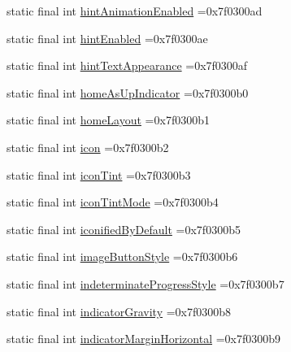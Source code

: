 \begin{DoxyCompactItemize}
\item 
static final int \mbox{\hyperlink{classcom_1_1example_1_1trainawearapplication_1_1_r_1_1attr_af8b7406b963a895c7f507e1d3a7715b4}{hint\+Animation\+Enabled}} =0x7f0300ad
\item 
static final int \mbox{\hyperlink{classcom_1_1example_1_1trainawearapplication_1_1_r_1_1attr_a52a1e53e1d4b6479a603c077cb747b50}{hint\+Enabled}} =0x7f0300ae
\item 
static final int \mbox{\hyperlink{classcom_1_1example_1_1trainawearapplication_1_1_r_1_1attr_adbb97bf82712b07fcc18eb977d167e37}{hint\+Text\+Appearance}} =0x7f0300af
\item 
static final int \mbox{\hyperlink{classcom_1_1example_1_1trainawearapplication_1_1_r_1_1attr_a07191ab6b641a690afd11e982de52fd8}{home\+As\+Up\+Indicator}} =0x7f0300b0
\item 
static final int \mbox{\hyperlink{classcom_1_1example_1_1trainawearapplication_1_1_r_1_1attr_a4585ece800fefe82fba75125a454aacc}{home\+Layout}} =0x7f0300b1
\item 
static final int \mbox{\hyperlink{classcom_1_1example_1_1trainawearapplication_1_1_r_1_1attr_a731d87071cc5f39adf07b4e184d70931}{icon}} =0x7f0300b2
\item 
static final int \mbox{\hyperlink{classcom_1_1example_1_1trainawearapplication_1_1_r_1_1attr_a4bcaacb0344b22eca81c6fde6f19184a}{icon\+Tint}} =0x7f0300b3
\item 
static final int \mbox{\hyperlink{classcom_1_1example_1_1trainawearapplication_1_1_r_1_1attr_a18e7c973e57789e03a5d1d8e95d7a267}{icon\+Tint\+Mode}} =0x7f0300b4
\item 
static final int \mbox{\hyperlink{classcom_1_1example_1_1trainawearapplication_1_1_r_1_1attr_a3d83fa912aa70602848f28d8ff0f2a5d}{iconified\+By\+Default}} =0x7f0300b5
\item 
static final int \mbox{\hyperlink{classcom_1_1example_1_1trainawearapplication_1_1_r_1_1attr_a6b348865826f3c7eba59eda188e60ae0}{image\+Button\+Style}} =0x7f0300b6
\item 
static final int \mbox{\hyperlink{classcom_1_1example_1_1trainawearapplication_1_1_r_1_1attr_a805b57524eb246cf099c81c1f716646d}{indeterminate\+Progress\+Style}} =0x7f0300b7
\item 
static final int \mbox{\hyperlink{classcom_1_1example_1_1trainawearapplication_1_1_r_1_1attr_a59ea400c1306a46e4f0e832091d965a6}{indicator\+Gravity}} =0x7f0300b8
\item 
static final int \mbox{\hyperlink{classcom_1_1example_1_1trainawearapplication_1_1_r_1_1attr_a43fa7f7a70bc53d67676f4be9a3d4a21}{indicator\+Margin\+Horizontal}} =0x7f0300b9

\end{DoxyCompactItemize}
